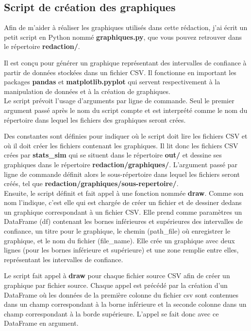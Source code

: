\documentclass[12pt,french,titlepage]{article}
\begin{document}
\newpage

\subsection{Script de création des graphiques}
\label{sec:script_graph}
Afin de m'aider à réaliser les graphiques utilisés dans cette rédaction, j'ai écrit un petit script en Python nommé \textbf{graphiques.py}, que vous pouvez retrouver dans le répertoire \textbf{redaction/}. 

Il est conçu pour générer un graphique représentant des intervalles de confiance à partir de données stockées dans un fichier CSV. Il fonctionne en important les packages \textbf{pandas} et \textbf{matplotlib.pyplot} qui servent respectivement à la manipulation de données et à la création de graphiques.\\

Le script prévoit l'usage d'arguments par ligne de commande. Seul le premier argument passé après le nom du script compte et est interprété comme le nom du répertoire dans lequel les fichiers des graphiques seront crées.

Des constantes sont définies pour indiquer où le script doit lire les fichiers CSV et où il doit créer les fichiers contenant les graphiques. Il lit donc les fichiers CSV crées par \textbf{stats\_sim} qui se situent dans le répertoire \textbf{out/} et dessine ses graphiques dans le répertoire \textbf{redaction/graphiques/}. L'argument passé par ligne de commande définit alors le sous-répertoire dans lequel les fichiers seront créés, tel que \textbf{redaction/graphiques/sous-repertoire/}.\\

Ensuite, le script définit et fait appel à une fonction nommée \textbf{draw}. Comme son nom l'indique, c'est elle qui est chargée de créer un fichier et de dessiner dedans un graphique correspondant à un fichier CSV. Elle prend comme paramètres un DataFrame (df) contenant les bornes inférieures et supérieures des intervalles de confiance, un titre pour le graphique, le chemin (path\_file) où enregistrer le graphique, et le nom du fichier (file\_name). Elle crée un graphique avec deux lignes (pour les bornes inférieure et supérieure) et une zone remplie entre elles, représentant les intervalles de confiance.

Le script fait appel à \textbf{draw} pour chaque fichier source CSV afin de créer un graphique par fichier source. Chaque appel est précédé par la création d'un DataFrame où les données de la première colonne du fichier csv sont contenues dans un champ correspondant à la borne inférieure et la seconde colonne dans un champ correspondant à la borde supérieure. L'appel se fait donc avec ce DataFrame en argument.
\end{document}
